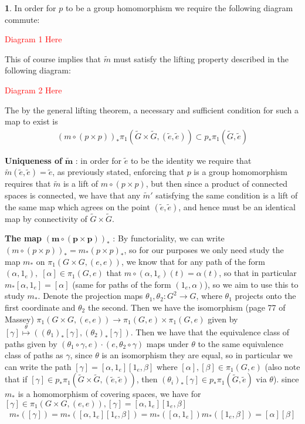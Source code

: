 \documentclass[10.5pt]{article}
\theoremstyle{definition}
\newtheorem{pb}{}
\begin{document}
    \begin{pb}
        In order for \(p\) to be a group homomorphism we require the following diagram commute:

        \textcolor{red}{Diagram 1 Here}

        This of course implies that \(\tilde{m}\) must satisfy the lifting property described in the following diagram:

        \textcolor{red}{Diagram 2 Here}

        The by the general lifting theorem, a necessary and sufficient condition for such a map to exist is
        \begin{align*}
            (m\circ(p\times p))_*\pi_1(\tilde{G}\times\tilde{G},(\tilde{e},\tilde{e})) \subset p_* \pi_1(\tilde{G},\tilde{e})
        \end{align*}

        \textbf{Uniqueness of} \(\mathbf{\tilde{m}}\) :
        in order for \(\tilde{e}\) to be the identity we require that \(\tilde{m}(\tilde{e},\tilde{e}) = \tilde{e}\), as previously stated, enforcing that \(p\) is a group homomorphism requires that \(\tilde{m}\) is a lift of \(m \circ (p \times p)\), but then since a product of connected spaces is connected, we have that any \(\tilde{m}'\) satisfying the same condition is a lift of the same map which agrees on the point \((\tilde{e},\tilde{e})\), and hence must be an identical map by connectivity of \(\tilde{G}\times \tilde{G}\).

        \textbf{The map} \(\mathbf{(m \circ (p\times p))_*}\) : By functoriality, we can write 
        \((m \circ (p\times p))_* = m_* (p\times p)_*\), so for our purposes we only need study the map \(m_*\) on \(\pi_1(G \times G,(e,e))\), we know that for any path of the form \((\alpha,1_e), \; [\alpha] \in \pi_1(G,e)\) that \(m \circ (\alpha,1_e) (t) = \alpha(t)\), so that in particular \(m_* [\alpha,1_e] = [\alpha]\) (same for paths of the form \((1_e,\alpha)\)), so we aim to use this to study \(m_*\). Denote the projection maps \(\theta_1,\theta_2: G^2 \to G\), where \(\theta_1\) projects onto the first coordinate and \(\theta_2\) the second. Then we have the isomorphism (page 77 of Massey) \(\pi_1(G \times G,(e,e)) \to \pi_1(G,e) \times \pi_1(G,e)\) given by \([\gamma] \overset{\theta}{\mapsto} ((\theta_1)_*[\gamma],(\theta_2)_*[\gamma])\). Then we have that the equivalence class of paths given by \((\theta_1\circ\gamma, e)\cdot(e,\theta_2\circ\gamma)\) maps under \(\theta\) to the same equivalence class of paths as \(\gamma\), since \(\theta\) is an isomorphism they are equal, so in particular we can write the path \([\gamma] = [\alpha,1_e][1_e,\beta]\) where \([\alpha], [\beta] \in \pi_1(G,e)\) (also note that if \([\gamma] \in p_*\pi_1(\tilde{G} \times{\tilde{G}},(\tilde{e},\tilde{e}))\), then \((\theta_i)_*[\gamma] \in p_*\pi_1(\tilde{G},\tilde{e})\) via \(\theta\)). since \(m_*\) is a homomorphism of covering spaces, we have for \([\gamma] \in \pi_1(G\times G, (e,e)), [\gamma] = [\alpha,1_e][1_e,\beta]\) 
        \begin{align*}
            m_*([\gamma]) = m_*([\alpha,1_e][1_e,\beta]) = m_*([\alpha,1_e])m_*([1_e,\beta]) = [\alpha][\beta]
        \end{align*}


\end{pb}
\end{document}
